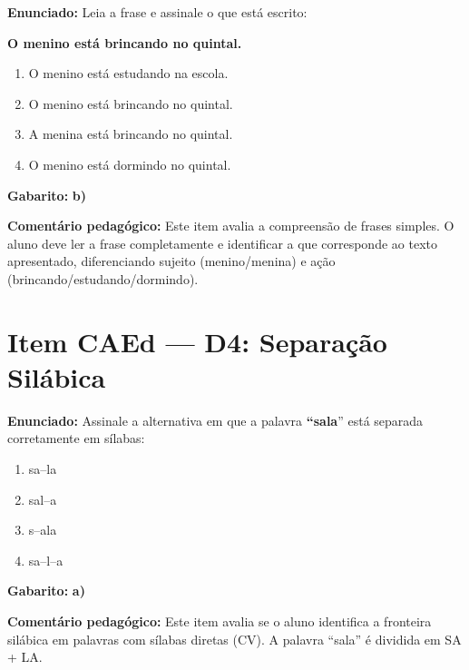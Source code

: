 \begin{exercicio}

\textbf{Enunciado:} Leia a frase e assinale o que est\'{a} escrito:

\begin{center}
\textbf{O menino est\'{a} brincando no quintal.}
\end{center}

\begin{enumerate}[label=\alph*)]
  \item O menino est\'{a} estudando na escola.
  \item O menino est\'{a} brincando no quintal.
  \item A menina est\'{a} brincando no quintal.
  \item O menino est\'{a} dormindo no quintal.
\end{enumerate}

\textbf{Gabarito:} \textbf{b)}

\textbf{Coment\'{a}rio pedag\'{o}gico:} Este item avalia a
compreens\~{a}o de frases simples. O aluno deve ler a frase
completamente e identificar a que corresponde ao texto apresentado,
diferenciando sujeito (menino/menina) e a\c{c}\~{a}o
(brincando/estudando/dormindo).
\end{exercicio}

\section{Item CAEd --- D4: Separa\c{c}\~{a}o Sil\'{a}bica}

\begin{exercicio}

\textbf{Enunciado:} Assinale a alternativa em que a palavra
\textbf{``sala}'' est\'{a} separada corretamente em s\'{i}labas:

\begin{enumerate}[label=\alph*)]
  \item sa--la
  \item sal--a
  \item s--ala
  \item sa--l--a
\end{enumerate}

\textbf{Gabarito:} \textbf{a)}

\textbf{Coment\'{a}rio pedag\'{o}gico:} Este item avalia se o aluno
identifica a fronteira sil\'{a}bica em palavras com s\'{i}labas
diretas (CV). A palavra ``sala'' \'{e} dividida em SA + LA.
\end{exercicio}

